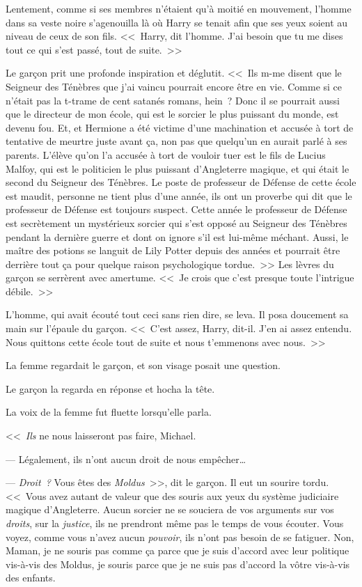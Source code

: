 Lentement, comme si ses membres n'étaient qu'à moitié en mouvement, l'homme dans sa veste noire s'agenouilla là où Harry se tenait afin que ses yeux soient au niveau de ceux de son fils. <<~Harry, dit l'homme. J'ai besoin que tu me dises tout ce qui s'est passé, tout de suite.~>>

Le garçon prit une profonde inspiration et déglutit. <<~Ils m-me disent que le Seigneur des Ténèbres que j'ai vaincu pourrait encore être en vie. Comme si ce n'était pas la t-trame de cent satanés romans, hein~? Donc il se pourrait aussi que le directeur de mon école, qui est le sorcier le plus puissant du monde, est devenu fou. Et, et Hermione a été victime d'une machination et accusée à tort de tentative de meurtre juste avant ça, non pas que quelqu'un en aurait parlé à ses parents. L'élève qu'on l'a accusée à tort de vouloir tuer est le fils de Lucius Malfoy, qui est le politicien le plus puissant d'Angleterre magique, et qui était le second du Seigneur des Ténèbres. Le poste de professeur de Défense de cette école est maudit, personne ne tient plus d'une année, ils ont un proverbe qui dit que le professeur de Défense est toujours suspect. Cette année le professeur de Défense est secrètement un mystérieux sorcier qui s'est opposé au Seigneur des Ténèbres pendant la dernière guerre et dont on ignore s'il est lui-même méchant. Aussi, le maître des potions se languit de Lily Potter depuis des années et pourrait être derrière tout ça pour quelque raison psychologique tordue.~>> Les lèvres du garçon se serrèrent avec amertume. <<~Je crois que c'est presque toute l'intrigue débile.~>>

L'homme, qui avait écouté tout ceci sans rien dire, se leva. Il posa doucement sa main sur l'épaule du garçon. <<~C'est assez, Harry, dit-il. J'en ai assez entendu. Nous quittons cette école tout de suite et nous t'emmenons avec nous.~>>

La femme regardait le garçon, et son visage posait une question.

Le garçon la regarda en réponse et hocha la tête.

La voix de la femme fut fluette lorsqu'elle parla.

<<~\emph{Ils} ne nous laisseront pas faire, Michael.

--- Légalement, ils n'ont aucun droit de nous empêcher…

--- \emph{Droit~?} Vous êtes des \emph{Moldus}~>>, dit le garçon. Il eut un sourire tordu. <<~Vous avez autant de valeur que des souris aux yeux du système judiciaire magique d'Angleterre. Aucun sorcier ne se souciera de vos arguments sur vos \emph{droits}, sur la \emph{justice}, ils ne prendront même pas le temps de vous écouter. Vous voyez, comme vous n'avez aucun \emph{pouvoir}, ils n'ont pas besoin de se fatiguer. Non, Maman, je ne souris pas comme ça parce que je suis d'accord avec leur politique vis-à-vis des Moldus, je souris parce que je ne suis pas d'accord la vôtre vis-à-vis des enfants.

